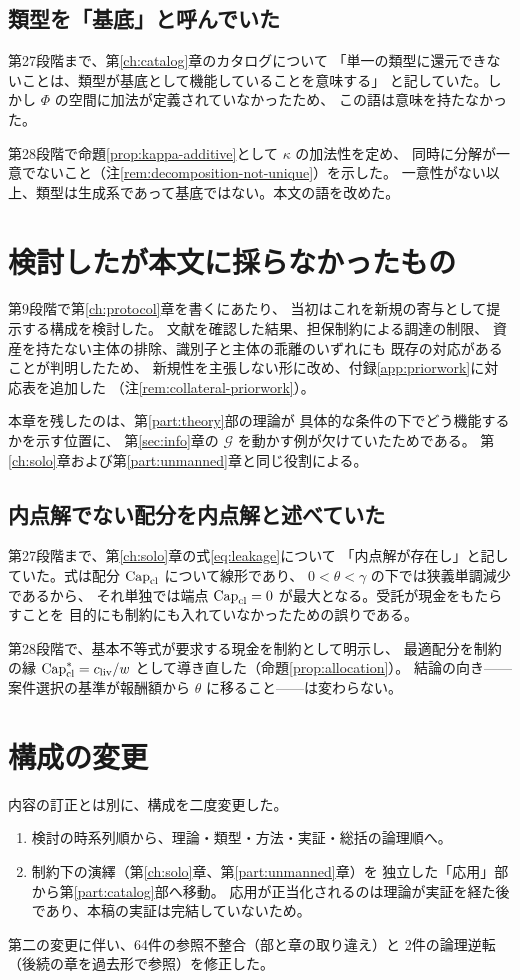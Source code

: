 \subsection{類型を「基底」と呼んでいた}
\label{sec:rev-basis}

第27段階まで、第\ref{ch:catalog}章のカタログについて
「単一の類型に還元できないことは、類型が基底として機能していることを意味する」
と記していた。しかし $\Phi$ の空間に加法が定義されていなかったため、
この語は意味を持たなかった。

第28段階で命題\ref{prop:kappa-additive}として $\kappa$ の加法性を定め、
同時に分解が一意でないこと（注\ref{rem:decomposition-not-unique}）を示した。
一意性がない以上、類型は生成系であって基底ではない。本文の語を改めた。

\section{検討したが本文に採らなかったもの}

第9段階で第\ref{ch:protocol}章を書くにあたり、
当初はこれを新規の寄与として提示する構成を検討した。
文献を確認した結果、担保制約による調達の制限、
資産を持たない主体の排除、識別子と主体の乖離のいずれにも
既存の対応があることが判明したため、
新規性を主張しない形に改め、付録\ref{app:priorwork}に対応表を追加した
（注\ref{rem:collateral-priorwork}）。

本章を残したのは、第\ref{part:theory}部の理論が
具体的な条件の下でどう機能するかを示す位置に、
第\ref{sec:info}章の $\mathcal{G}$ を動かす例が欠けていたためである。
第\ref{ch:solo}章および第\ref{part:unmanned}章と同じ役割による。

\subsection{内点解でない配分を内点解と述べていた}
\label{sec:rev-interior}

第27段階まで、第\ref{ch:solo}章の式\eqref{eq:leakage}について
「内点解が存在し」と記していた。式は配分 $\mathrm{Cap}_{\mathrm{cl}}$ について線形であり、
$0<\theta<\gamma$ の下では狭義単調減少であるから、
それ単独では端点 $\mathrm{Cap}_{\mathrm{cl}}=0$ が最大となる。受託が現金をもたらすことを
目的にも制約にも入れていなかったための誤りである。

第28段階で、基本不等式が要求する現金を制約として明示し、
最適配分を制約の縁 $\mathrm{Cap}_{\mathrm{cl}}^\ast=c_{\rm liv}/w$ として導き直した（命題\ref{prop:allocation}）。
結論の向き——案件選択の基準が報酬額から $\theta$ に移ること——は変わらない。

\section{構成の変更}

内容の訂正とは別に、構成を二度変更した。

\begin{enumerate}[label=(\arabic*)]
\item 検討の時系列順から、理論・類型・方法・実証・総括の論理順へ。
\item 制約下の演繹（第\ref{ch:solo}章、第\ref{part:unmanned}章）を
独立した「応用」部から第\ref{part:catalog}部へ移動。
応用が正当化されるのは理論が実証を経た後であり、本稿の実証は完結していないため。
\end{enumerate}

第二の変更に伴い、64件の参照不整合（部と章の取り違え）と
2件の論理逆転（後続の章を過去形で参照）を修正した。
